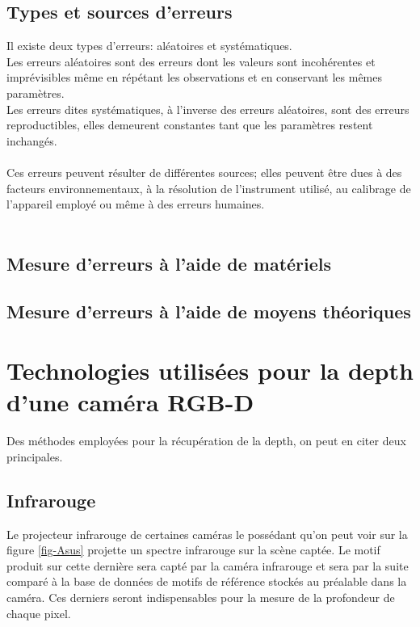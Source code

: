 \documentclass[a4paper, 12pt]{book}
\begin{document}
\subsection{Types et sources d'erreurs}
Il existe deux types d'erreurs: aléatoires et systématiques. \\ Les erreurs aléatoires sont des erreurs dont les valeurs sont incohérentes et imprévisibles même en répétant les observations et en conservant les mêmes paramètres. \\Les erreurs dites systématiques, à l'inverse des erreurs aléatoires, sont des erreurs reproductibles, elles demeurent constantes tant que les paramètres restent inchangés. \\ \\
Ces erreurs peuvent résulter de différentes sources; elles peuvent être dues à des facteurs environnementaux, à la résolution de l'instrument utilisé, au calibrage de l'appareil employé ou même à des erreurs humaines. \\ \\
\subsection{Mesure d'erreurs à l'aide de matériels}
\subsection{Mesure d'erreurs à l'aide de moyens théoriques}



\section[Technologies utilisées pour la depth]{Technologies utilisées pour la depth d'une caméra RGB-D} 
Des méthodes employées pour la récupération de la depth, on peut en citer deux principales.
\subsection{Infrarouge}
Le projecteur infrarouge de certaines caméras le possédant qu'on peut voir sur la figure \ref{fig-Asus} projette un spectre infrarouge sur la scène captée. Le motif produit sur cette dernière sera capté par la caméra infrarouge et sera par la suite comparé à la base de données de motifs de référence stockés au préalable dans la caméra. Ces derniers seront indispensables pour la mesure de la profondeur de chaque pixel. 
\end{document}
